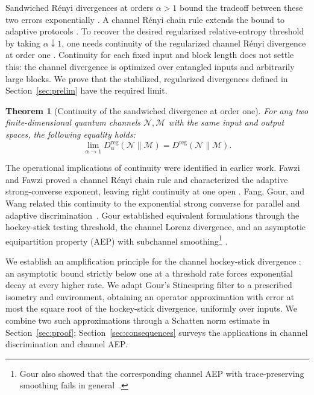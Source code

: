 \documentclass[11pt,letterpaper]{article}
\numberwithin{equation}{section}
\newtheorem{theorem}{Theorem}
\newcommand{\N}{\mathcal N}
\newcommand{\M}{\mathcal M}
\newcommand{\reg}{\mathrm{reg}}
\newcommand{\Dt}{D}
\begin{document}
Sandwiched R\'enyi divergences at orders $\alpha>1$ bound the tradeoff between these two errors exponentially \cite{MLDFT,WWY}. A channel R\'enyi chain rule extends the bound to adaptive protocols \cite{FF}. To recover the desired regularized relative-entropy threshold by taking $\alpha\downarrow1$, one needs continuity of the regularized channel R\'enyi divergence at order one \cite{FF,FGW}. Continuity for each fixed input and block length does not settle this: the channel divergence is optimized over entangled inputs and arbitrarily large blocks. We prove that the stabilized, regularized divergences defined in Section~\ref{sec:prelim} have the required limit.

\begin{theorem}[Continuity of the sandwiched divergence at order one]\label{thm:main}
For any two finite-dimensional quantum channels $\N,\M$ with the same input and output spaces, the following equality holds:
\begin{equation}\label{eq:main}
 \lim_{\alpha\to1}\Dt_\alpha^{\reg}(\N\|\M)
       =D^{\reg}(\N\|\M).
\end{equation}
\end{theorem}

The operational implications of continuity were identified in earlier work. Fawzi and Fawzi proved a channel R\'enyi chain rule and characterized the adaptive strong-converse exponent, leaving right continuity at one open \cite{FF}. Fang, Gour, and Wang related this continuity to the exponential strong converse for parallel and adaptive discrimination~\cite{FGW}. Gour established equivalent formulations through the hockey-stick testing threshold, the channel Lorenz divergence, and an asymptotic equipartition property (AEP) with subchannel smoothing\footnote{Gour also showed that the corresponding channel AEP with trace-preserving smoothing fails in general~\cite{Gour}.} \cite[Theorem 14]{Gour}.

We establish an amplification principle for the channel hockey-stick divergence \cite{Gour,SW}: an asymptotic bound strictly below one at a threshold rate forces exponential decay at every higher rate. We adapt Gour's Stinespring filter \cite{Gour} to a prescribed isometry and environment, obtaining an operator approximation with error at most the square root of the hockey-stick divergence, uniformly over inputs. We combine two such approximations through a Schatten norm estimate in Section~\ref{sec:proof}; Section~\ref{sec:consequences} surveys the applications in channel discrimination and channel AEP.
\end{document}
